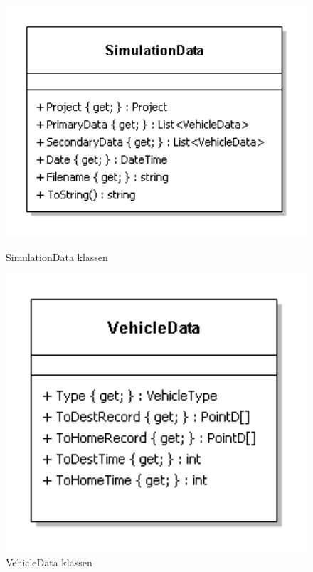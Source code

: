 \begin{figure}[H]
\centering
\begin{minipage}{0.45\textwidth}
\centering
\includegraphics[width=1\textwidth,height=\textheight,keepaspectratio]{Pictures/Klassediagram/SimulationData}
\caption{SimulationData klassen}
\label{SimData}
\end{minipage}\hfill
\begin{minipage}{0.45\textwidth}
\centering
\includegraphics[width=1\textwidth,height=\textheight,keepaspectratio]{Pictures/Klassediagram/VehicleData}
\caption{VehicleData klassen}
\label{VehicleData}
\end{minipage}
\end{figure}

